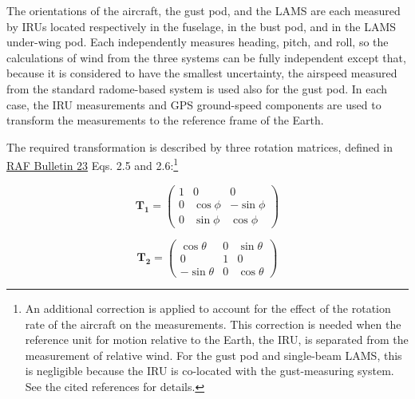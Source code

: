 \documentclass[12pt,twoside,english]{article}\usepackage[]{graphicx}\usepackage[]{color}
\let\OrgIndex\index
\renewcommand*{\index}[1]{\OrgIndex{#1}}
\begin{document}
The orientations of the aircraft, the gust pod, and the LAMS are each measured by IRUs located respectively in the fuselage, in the bust pod, and in the LAMS under-wing pod. Each independently measures heading, pitch, and roll, so the calculations of wind from the three systems can be fully independent except that, because it is considered to have the smallest uncertainty, the airspeed measured from the standard radome-based system is used also for the gust pod. In each case, the IRU measurements and GPS ground-speed components are used to transform the measurements to the reference frame of the Earth. 

The required transformation is described by three rotation matrices, defined in \href{https://www.eol.ucar.edu/raf/Bulletins/bulletin23.html}{RAF Bulletin 23} Eqs. 2.5 and 2.6:\footnote{An additional correction is applied to account for the effect of the rotation rate of the aircraft on the measurements. This correction is needed when the reference unit for motion relative to the Earth, the IRU, is separated from the measurement of relative wind. For the gust pod and single-beam LAMS, this is negligible because the IRU is co-located with the gust-measuring system. See the cited references for details.} 

\[
\mathbf{T_{1}}=\left(\begin{array}{ccc}
1 & 0 & 0\\ 0 & \cos\phi & -\sin\phi\\ 0 & \sin\phi & \cos\phi 
\end{array}\right) 
\]


\begin{equation}
\mathbf{T_{2}}=\left(\begin{array}{ccc}
\cos\theta & 0 & \sin\theta\\ 0 & 1 & 0\\ -\sin\theta & 0 & \cos\theta 
\end{array}\right)\label{eq:rotation-matrices}
\end{equation}
\end{document}
